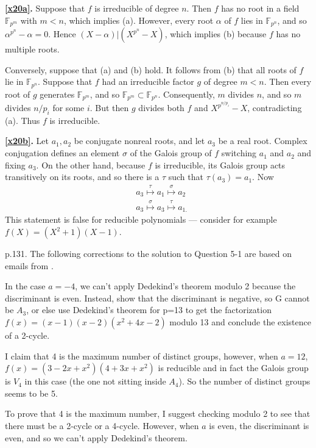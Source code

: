 \documentclass[a4paper,11pt,final,openany]{memoir}
\theoremstyle{nonumberplain}
\begin{document}
\medskip\noindent\textbf{\ref{x20a}.} Suppose that $f$ is irreducible of
degree $n$. Then $f$ has no root in a field $\mathbb{F}{}_{p^{m}}$ with $m<n$,
which implies (a). However, every root $\alpha$ of $f$ lies in $\mathbb{F}%
{}_{p^{n}}$, and so $\alpha^{p^{n}}-\alpha=0$. Hence $(X-\alpha)|(X^{p^{n}%
}-X)$, which implies (b) because $f$ has no multiple roots.

Conversely, suppose that (a) and (b) hold. It follows from (b) that all roots
of $f$ lie in $\mathbb{F}{}_{p^{n}}$. Suppose that $f$ had an irreducible
factor $g$ of degree $m<n$. Then every root of $g$ generates $\mathbb{F}%
{}_{p^{m}}$, and so $\mathbb{F}{}_{p^{m}}\subset\mathbb{F}{}_{p^{n}}$.
Consequently, $m$ divides $n$, and so $m$ divides $n/p_{i}$ for some $i$. But
then $g$ divides both $f$ and $X^{p^{n/p_{i}}}-X$, contradicting (a). Thus $f$
is irreducible.

\medskip\noindent\textbf{\ref{x20b}.} Let $a_{1},a_{2}$ be conjugate nonreal
roots, and let $a_{3}$ be a real root. Complex conjugation defines an element
$\sigma$ of the Galois group of $f$ switching $a_{1}$ and $a_{2}$ and fixing
$a_{3}$. On the other hand, because $f$ is irreducible, its Galois group acts
transitively on its roots, and so there is a $\tau$ such that $\tau
(a_{3})=a_{1}$. Now%
\begin{align*}
&  a_{3}\overset{\tau}{\mapsto}a_{1}\overset{\sigma}{\mapsto}a_{2}\\
&  a_{3}\overset{\sigma}{\mapsto}a_{3}\overset{\tau}{\mapsto}a_{1\text{.}}%
\end{align*}
This statement is false for reducible polynomials --- consider for example
$f(X)=(X^{2}+1)(X-1)$.

p.131. The following corrections to the solution to Question 5-1 are based on
emails from .

In the case $a=-4$, we can't apply Dedekind's theorem modulo 2 because the
discriminant is even. Instead, show that the discriminant is negative, so G
cannot be $A_{3}$, or else use Dedekind's theorem for p=13 to get the
factorization $f(x)=(x-1)(x-2)(x^{2}+4x-2)$ modulo 13 and conclude the
existence of a 2-cycle.

I claim that 4 is the maximum number of distinct groups, however, when $a=12$,
$f(x)=(3 - 2 x + x^{2}) (4 + 3 x + x^{2})$ is reducible and in fact the Galois
group is $V_{4}$ in this case (the one not sitting inside $A_{4}$). So the
number of distinct groups seems to be 5.

To prove that 4 is the maximum number, I suggest checking modulo 2 to see that
there must be a 2-cycle or a 4-cycle. However, when $a$ is even, the
discriminant is even, and so we can't apply Dedekind's theorem.
\end{document}
